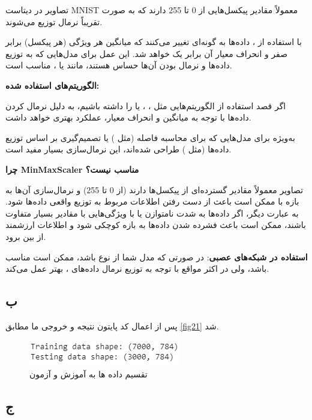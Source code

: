 \documentclass{article}
\begin{document}
تصاویر در دیتاست MNIST معمولاً مقادیر پیکسل‌هایی از 0 تا 255 دارند که به صورت تقریباً نرمال توزیع می‌شوند.

با استفاده از ، داده‌ها به گونه‌ای تغییر می‌کنند که میانگین هر ویژگی (هر پیکسل) برابر صفر و انحراف معیار آن برابر یک خواهد شد. این عمل برای مدل‌هایی که به توزیع داده‌ها و نرمال بودن آن‌ها حساس هستند، مانند  یا ، مناسب است.

\textbf{الگوریتم‌های استفاده شده:}

اگر قصد استفاده از الگوریتم‌هایی مثل ، ،  یا  را داشته باشیم،  به دلیل نرمال کردن داده‌ها با توجه به میانگین و انحراف معیار، عملکرد بهتری خواهد داشت.

به‌ویژه برای مدل‌هایی که برای محاسبه فاصله (مثل ) یا تصمیم‌گیری بر اساس توزیع داده‌ها (مثل ) طراحی شده‌اند، این نرمال‌سازی بسیار مفید است.

\textbf{چرا MinMaxScaler مناسب نیست؟}

تصاویر  معمولاً مقادیر گسترده‌ای از پیکسل‌ها دارند (از 0 تا 255) و نرمال‌سازی آن‌ها به بازه \lr{[0, 1]} با  ممکن است باعث از دست رفتن اطلاعات مربوط به توزیع واقعی داده‌ها شود. به عبارت دیگر، اگر داده‌ها به شدت نامتوازن یا با ویژگی‌هایی با مقادیر بسیار متفاوت باشند،  ممکن است باعث فشرده شدن داده‌ها به بازه کوچکی شود و اطلاعات ارزشمند از بین برود.

\textbf{استفاده در شبکه‌های عصبی}: در صورتی که مدل شما از نوع  باشد،  ممکن است مناسب باشد، ولی در اکثر مواقع با توجه به توزیع نرمال داده‌های ،  بهتر عمل می‌کند.


\subsection{ب}

پس از اعمال کد پایتون نتیجه و خروجی ما مطابق \autoref{fig21} شد.

\begin{figure}[h!]
    \centering
    \includegraphics[width=0.5\linewidth]{q2_p1.png}
    \caption{تقسیم داده ها به آموزش و آزمون}
    \label{fig21}
\end{figure}


\subsection{ج}
\end{document}
